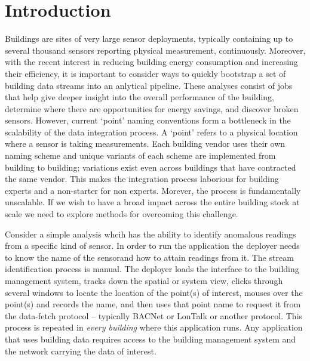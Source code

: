 \section{Introduction}

Buildings are sites of very large sensor deployments, typically containing
up to several thousand sensors reporting physical measurement, continuously.
Moreover, with the recent interest in reducing building energy consumption and
increasing their efficiency, it
is important to consider ways to quickly bootstrap a set of building data streams
into an anlytical pipeline.  These analyses consist of jobs that help give deeper
insight into the overall performance of the building, 
determine where there are opportunities for energy savings, and 
discover broken sensors.
However, current `point' naming conventions form a bottleneck in the scalability of
the data integration process.  A `point' refers to a physical location where
a sensor is taking measurements. Each building vendor uses their own naming scheme and
unique variants of each scheme are implemented from building to building; variations exist
even across buildings that have contracted the same vendor.
This makes the integration process laborious for building experts and a non-starter for 
non experts.  Morever, the process is fundamentally unscalable. 
If we
wish to have a broad impact across the entire building stock at scale we need
to explore methods for overcoming this challenge.

Consider a simple analysis whcih has the ability
to identify anomalous readings from a specific kind of sensor.  In order to run the application
the deployer needs to know the name of the sensorand how to attain readings from it.
The stream identification process is manual.  The deployer loads the interface to the 
building management system, tracks down the spatial or system view, clicks through several windows
to locate the location of the point(s) of interest, mouses over the point(s) and records the name,
and then uses that point name to request it from the data-fetch protocol -- typically BACNet or 
LonTalk or another protocol. This process is repeated in \emph{every building} where this 
application runs.  Any application that uses building data requires access to the building
management system and the network carrying the data of interest.

